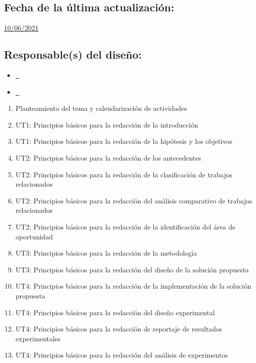 \documentclass[10 pt]{article}
\begin{document}
\subsection{Fecha de la \'{u}ltima actualizaci\'{o}n:} \underline{10/06/2021}
\subsection{Responsable(s) del dise\~{n}o:}
\begin{itemize}[label={}]
\item \underline{\nroger~\roger}
\item \underline{\nelisa~\elisa}
\end{itemize}
\newpage



\begin{enumerate}[itemsep=-2pt]
\item Planteamiento del tema y calendarizaci\'{o}n de actividades
\item UT1: Principios b\'{a}sicos para la redacci\'{o}n de la introducci\'{o}n
\item UT1: Principios b\'{a}sicos para la redacci\'{o}n de la hip\'{o}tesis y los objetivos
\item UT2: Principios b\'{a}sicos para la redacci\'{o}n de los antecedentes
\item UT2: Principios b\'{a}sicos para la redacci\'{o}n de la clasificaci\'{o}n de trabajos relacionados
\item UT2: Principios b\'{a}sicos para la redacci\'{o}n del an\'{a}lisis comparativo de trabajos relacionados
\item UT2: Principios b\'{a}sicos para la redacci\'{o}n de la identificaci\'{o}n del \'{a}rea de oportunidad
\item UT3: Principios b\'{a}sicos para la redacci\'{o}n de la metodolog\'{\i}a
\item UT3: Principios b\'{a}sicos para la redacci\'{o}n del dise\~{n}o de la soluci\'{o}n propuesta
\item UT4: Principios b\'{a}sicos para la redacci\'{o}n de la implementaci\'{o}n de la soluci\'{o}n propuesta
\item UT4: Principios b\'{a}sicos para la redacci\'{o}n del dise\~{n}o experimental
\item UT4: Principios b\'{a}sicos para la redacci\'{o}n de reportaje de resultados experimentales
\item UT4: Principios b\'{a}sicos para la redacci\'{o}n del an\'{a}lisis de experimentos

\end{enumerate}
\end{document}
